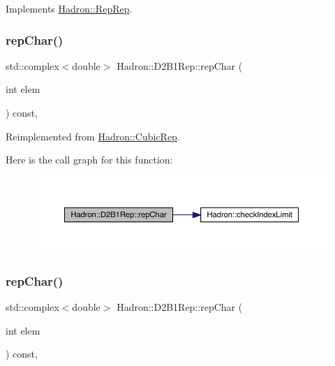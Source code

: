 Implements \mbox{\hyperlink{structHadron_1_1RepRep_ab3213025f6de249f7095892109575fde}{Hadron\+::\+Rep\+Rep}}.

\mbox{\label{structHadron_1_1D2B1Rep_a306ddfcdbe8144f7f602a2814810cc7f}} 
\subsubsection{\texorpdfstring{repChar()}{repChar()}\hspace{0.1cm}{\footnotesize\ttfamily [1/3]}}
{\footnotesize\ttfamily std\+::complex$<$double$>$ Hadron\+::\+D2\+B1\+Rep\+::rep\+Char (\begin{DoxyParamCaption}\item[{int}]{elem }\end{DoxyParamCaption}) const\hspace{0.3cm}{\ttfamily [inline]}, {\ttfamily [virtual]}}



Reimplemented from \mbox{\hyperlink{structHadron_1_1CubicRep_af45227106e8e715e84b0af69cd3b36f8}{Hadron\+::\+Cubic\+Rep}}.

Here is the call graph for this function\+:
\nopagebreak
\begin{figure}[H]
\begin{center}
\leavevmode
\includegraphics[width=350pt]{d1/d67/structHadron_1_1D2B1Rep_a306ddfcdbe8144f7f602a2814810cc7f_cgraph}
\end{center}
\end{figure}
\mbox{\label{structHadron_1_1D2B1Rep_a306ddfcdbe8144f7f602a2814810cc7f}} 
\subsubsection{\texorpdfstring{repChar()}{repChar()}\hspace{0.1cm}{\footnotesize\ttfamily [2/3]}}
{\footnotesize\ttfamily std\+::complex$<$double$>$ Hadron\+::\+D2\+B1\+Rep\+::rep\+Char (\begin{DoxyParamCaption}\item[{int}]{elem }\end{DoxyParamCaption}) const\hspace{0.3cm}{\ttfamily [inline]}, {\ttfamily [virtual]}}



